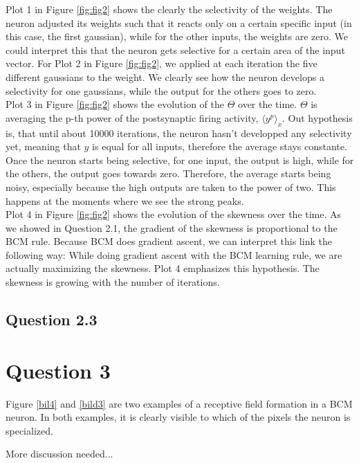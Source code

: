Plot 1 in Figure \ref{fig:fig2} shows the clearly the selectivity of the weights. The neuron adjusted its weights such that it reacts only on a certain specific input (in this case, the first gaussian), while for the other inputs, the weights are zero. We could interpret this that the neuron gets selective for a certain area of the input vector. \newline
For Plot 2 in Figure \ref{fig:fig2}, we applied at each iteration the five different gaussians to the weight. We clearly see how the neuron develops a selectivity for one gaussians, while the output for the others goes to zero. \\
Plot 3 in Figure \ref{fig:fig2} shows the evolution of the $\Theta$ over the time. $\Theta$ is averaging the p-th power of the postsynaptic firing activity, $\langle y^p \rangle_x$. Out hypothesis is, that until about 10000 iterations, the neuron hasn't developped any selectivity yet, meaning that $y$ is equal for all inputs, therefore the average stays constante. Once the neuron starts being selective, for one input, the output is high, while for the others, the output goes towards zero. Therefore, the average starts being noisy, especially because the high outputs are taken to the power of two. This happens at the moments where we see the strong peaks. \\
Plot 4 in Figure \ref{fig:fig2} shows the evolution of the skewness over the time. As we showed in Question 2.1, the gradient of the skewness is proportional to the BCM rule. Because BCM does gradient ascent, we can interpret this link the following way: While doing gradient ascent with the BCM learning rule, we are actually maximizing the skewness. Plot 4 emphasizes this hypothesis. The skewness is growing with the number of iterations.

\subsection{Question 2.3}


\section{Question 3}

Figure \ref{bil4} and \ref{bild3} are two examples of a receptive field formation in a BCM neuron. In both examples, it is clearly visible to which of the pixels the neuron is specialized.

More discussion needed...

